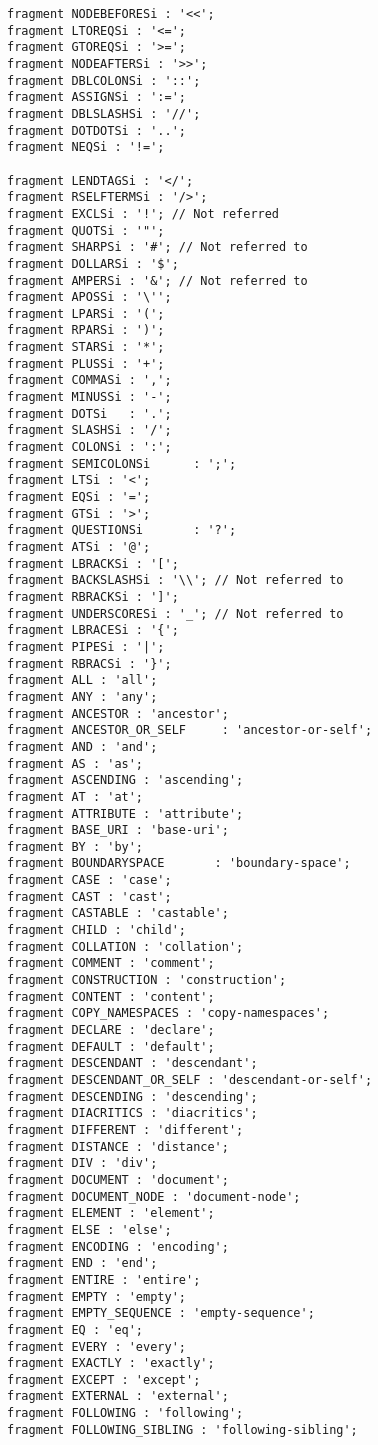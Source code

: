 \begin{verbatim}
fragment NODEBEFORESi : '<<';
fragment LTOREQSi : '<=';
fragment GTOREQSi : '>=';
fragment NODEAFTERSi : '>>';
fragment DBLCOLONSi : '::';
fragment ASSIGNSi : ':=';
fragment DBLSLASHSi : '//';
fragment DOTDOTSi : '..';
fragment NEQSi : '!=';

fragment LENDTAGSi : '</'; 
fragment RSELFTERMSi : '/>';
fragment EXCLSi : '!'; // Not referred
fragment QUOTSi : '"';
fragment SHARPSi : '#'; // Not referred to
fragment DOLLARSi : '$';
fragment AMPERSi : '&'; // Not referred to
fragment APOSSi : '\'';
fragment LPARSi : '(';
fragment RPARSi : ')';
fragment STARSi : '*';
fragment PLUSSi : '+';
fragment COMMASi : ',';
fragment MINUSSi : '-';
fragment DOTSi   : '.';
fragment SLASHSi : '/';
fragment COLONSi : ':';
fragment SEMICOLONSi      : ';';
fragment LTSi : '<';
fragment EQSi : '=';
fragment GTSi : '>';
fragment QUESTIONSi       : '?';
fragment ATSi : '@';
fragment LBRACKSi : '[';
fragment BACKSLASHSi : '\\'; // Not referred to
fragment RBRACKSi : ']';
fragment UNDERSCORESi : '_'; // Not referred to
fragment LBRACESi : '{';
fragment PIPESi : '|';
fragment RBRACSi : '}';
fragment ALL : 'all';
fragment ANY : 'any';
fragment ANCESTOR : 'ancestor';
fragment ANCESTOR_OR_SELF     : 'ancestor-or-self';
fragment AND : 'and';
fragment AS : 'as';
fragment ASCENDING : 'ascending';
fragment AT : 'at';
fragment ATTRIBUTE : 'attribute';
fragment BASE_URI : 'base-uri';
fragment BY : 'by';
fragment BOUNDARYSPACE       : 'boundary-space';
fragment CASE : 'case';
fragment CAST : 'cast';
fragment CASTABLE : 'castable';
fragment CHILD : 'child';
fragment COLLATION : 'collation';
fragment COMMENT : 'comment';
fragment CONSTRUCTION : 'construction';
fragment CONTENT : 'content';
fragment COPY_NAMESPACES : 'copy-namespaces';
fragment DECLARE : 'declare';
fragment DEFAULT : 'default';
fragment DESCENDANT : 'descendant';
fragment DESCENDANT_OR_SELF : 'descendant-or-self';
fragment DESCENDING : 'descending';
fragment DIACRITICS : 'diacritics';
fragment DIFFERENT : 'different';
fragment DISTANCE : 'distance';
fragment DIV : 'div';
fragment DOCUMENT : 'document';
fragment DOCUMENT_NODE : 'document-node';
fragment ELEMENT : 'element';
fragment ELSE : 'else';
fragment ENCODING : 'encoding';
fragment END : 'end';
fragment ENTIRE : 'entire';
fragment EMPTY : 'empty';
fragment EMPTY_SEQUENCE : 'empty-sequence';
fragment EQ : 'eq';
fragment EVERY : 'every';
fragment EXACTLY : 'exactly';
fragment EXCEPT : 'except';
fragment EXTERNAL : 'external';
fragment FOLLOWING : 'following';
fragment FOLLOWING_SIBLING : 'following-sibling';

\end{verbatim}
